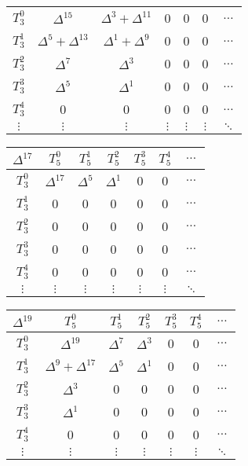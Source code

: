 \begin{center}
\begin{tabular}{|c|cccccc|}
	$T_3^0$ & $\Delta^{15}$ & $\Delta^3 + \Delta^{11}$ & 0 & 0 & 0 & $\dots$ \\
	$T_3^1$ & $\Delta^5 + \Delta^{13}$ & $\Delta^1 + \Delta^9$ & 0 & 0 & 0 & $\dots$ \\
	$T_3^2$ & $\Delta^7$ & $\Delta^3$ & 0 & 0 & 0 & $\dots$ \\
	$T_3^3$ & $\Delta^5$ & $\Delta^1$ & 0 & 0 & 0 & $\dots$ \\
	$T_3^4$ & 0 & 0 & 0 & 0 & 0 & $\dots$ \\
	$\vdots$ & $\vdots$ & $\vdots$ & $\vdots$ & $\vdots$ & $\vdots$ & $\ddots$ \\\hline
\end{tabular}
\begin{tabular}{|c|cccccc|}
	\hline
	\textbf{$\Delta^{17}$} & \textbf{$T_5^0$} & \textbf{$T_5^1$} & \textbf{$T_5^2$} & \textbf{$T_5^3$} & \textbf{$T_5^4$} & \textbf{$\dots$} \\\hline
	$T_3^0$ & $\Delta^{17}$ & $\Delta^5$ & $\Delta^1$ & 0 & 0 & $\dots$ \\
	$T_3^1$ & 0 & 0 & 0 & 0 & 0 & $\dots$ \\
	$T_3^2$ & 0 & 0 & 0 & 0 & 0 & $\dots$ \\
	$T_3^3$ & 0 & 0 & 0 & 0 & 0 & $\dots$ \\
	$T_3^4$ & 0 & 0 & 0 & 0 & 0 & $\dots$ \\
	$\vdots$ & $\vdots$ & $\vdots$ & $\vdots$ & $\vdots$ & $\vdots$ & $\ddots$ \\\hline
\end{tabular}
\begin{tabular}{|c|cccccc|}
	\hline
	\textbf{$\Delta^{19}$} & \textbf{$T_5^0$} & \textbf{$T_5^1$} & \textbf{$T_5^2$} & \textbf{$T_5^3$} & \textbf{$T_5^4$} & \textbf{$\dots$} \\\hline
	$T_3^0$ & $\Delta^{19}$ & $\Delta^7$ & $\Delta^3$ & 0 & 0 & $\dots$ \\
	$T_3^1$ & $\Delta^9 + \Delta^{17}$ & $\Delta^5$ & $\Delta^1$ & 0 & 0 & $\dots$ \\
	$T_3^2$ & $\Delta^3$ & 0 & 0 & 0 & 0 & $\dots$ \\
	$T_3^3$ & $\Delta^1$ & 0 & 0 & 0 & 0 & $\dots$ \\
	$T_3^4$ & 0 & 0 & 0 & 0 & 0 & $\dots$ \\
	$\vdots$ & $\vdots$ & $\vdots$ & $\vdots$ & $\vdots$ & $\vdots$ & $\ddots$ \\\hline
\end{tabular}
\begin{tabular}{|c|cccccc|}
	\hline

\end{tabular}
\end{center}
